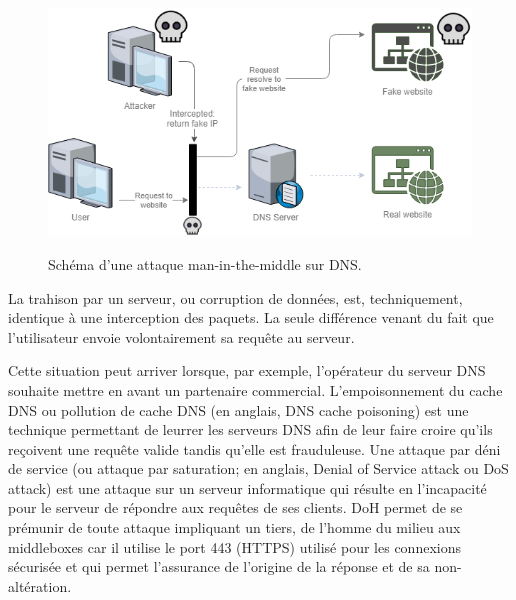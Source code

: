 \documentclass[a4paper,12pt]{article}
\begin{document}
	\begin{figure}[H]
		\begin{center}
			{\includegraphics[scale=0.5]{Images/dns_spoofing.png}}
			\hspace*{12pt}\hbox{\scriptsize {}}
		\end{center}
		\caption{Schéma d'une attaque man-in-the-middle sur DNS.}		 
		
	\end{figure}
	
	La trahison par un serveur, ou corruption de données, est, techniquement, identique à une interception des paquets.
	La seule différence venant du fait que l'utilisateur envoie volontairement sa requête au serveur. 
	
	Cette situation peut arriver lorsque, par exemple, l'opérateur du serveur DNS souhaite mettre en avant un partenaire commercial.
	L'empoisonnement du cache DNS ou pollution de cache DNS (en anglais, DNS cache poisoning) est une technique permettant de leurrer les serveurs DNS afin de leur faire croire qu'ils reçoivent une requête valide tandis qu'elle est frauduleuse.
	Une attaque par déni de service (ou attaque par saturation; en anglais, Denial of Service attack ou DoS attack) est une attaque sur un serveur informatique qui résulte en l'incapacité pour le serveur de répondre aux requêtes de ses clients.
	DoH permet de se prémunir de toute attaque impliquant un tiers, de l’homme du milieu aux middleboxes car il utilise le port 443 (HTTPS) utilisé pour les connexions sécurisée et qui permet l'assurance de l'origine de la réponse et de sa non-altération.
	
\end{document}
